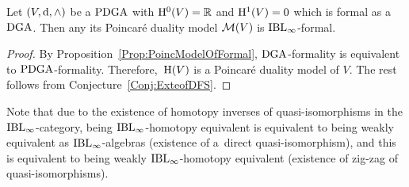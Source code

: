 \documentclass[\MainFolder/Text.tex]{subfiles}
\begin{document}
\begin{Conjecture}\label{Con:DGAIBLForm}
Let $(V,\mathrm{d},\wedge)$ be a $\mathrm{PDGA}$ with $\mathrm{H}^0(V)=\mathbb{R}$ and $\mathrm{H}^1(V)=0$ which is formal as a $\mathrm{DGA}$. Then any its Poincar\'e duality model $\mathcal{M}(V)$ is $\mathrm{IBL}_\infty$-formal.
\end{Conjecture}
\begin{proof}
By Proposition~\ref{Prop:PoincModelOfFormal}, $\mathrm{DGA}$-formality is equivalent to $\mathrm{PDGA}$-formality. Therefore,~$\mathrm{H}(V)$ is a Poincar\'e duality model of $V$. The rest follows from Conjecture~\ref{Conj:ExteofDFS}.
\end{proof}

Note that due to the existence of homotopy inverses of quasi-isomorphisms in the $\mathrm{IBL}_\infty$-category, being $\mathrm{IBL}_\infty$-homotopy equivalent is equivalent to being weakly equivalent as $\mathrm{IBL}_\infty$-algebras (existence of a~direct quasi-isomorphism), and this is equivalent to being weakly $\mathrm{IBL}_\infty$-homotopy equivalent (existence of zig-zag of quasi-isomorphisms).
\end{document}
